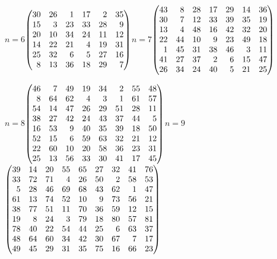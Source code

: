 \medskip
{\scriptsize\setlength{\arraycolsep}{1.25pt}\renewcommand{\arraystretch}{0.95}
\noindent\hfill $n=6$\quad$\left(\begin{array}{@{}rrrrrr@{}}30&26&1&17&2&35\\15&3&23&33&28&9\\20&10&34&24&11&12\\14&22&21&4&19&31\\25&32&6&5&27&16\\8&13&36&18&29&7\end{array}\right)$\hfill $n=7$\quad$\left(\begin{array}{@{}rrrrrrr@{}}43&8&28&17&29&14&36\\30&7&12&33&39&35&19\\13&4&48&16&42&32&20\\22&44&10&9&23&49&18\\1&45&31&38&46&3&11\\41&27&37&2&6&15&47\\26&34&24&40&5&21&25\end{array}\right)$\hfill\null\par\medskip
\noindent\hfill $n=8$\quad$\left(\begin{array}{@{}rrrrrrrr@{}}46&7&49&19&34&2&55&48\\8&64&62&4&3&1&61&57\\54&14&47&26&29&51&28&11\\38&27&42&24&43&37&44&5\\16&53&9&40&35&39&18&50\\52&15&6&59&63&32&21&12\\22&60&10&20&58&36&23&31\\25&13&56&33&30&41&17&45\end{array}\right)$\hfill $n=9$\quad$\left(\begin{array}{@{}rrrrrrrrr@{}}39&14&20&55&65&27&32&41&76\\33&72&71&4&26&50&2&58&53\\5&28&46&69&68&43&62&1&47\\61&13&74&52&10&9&73&56&21\\38&77&51&11&70&36&59&12&15\\19&8&24&3&79&18&80&57&81\\78&40&22&54&44&25&6&63&37\\48&64&60&34&42&30&67&7&17\\49&45&29&31&35&75&16&66&23\end{array}\right)$\hfill\null\par\medskip
}
